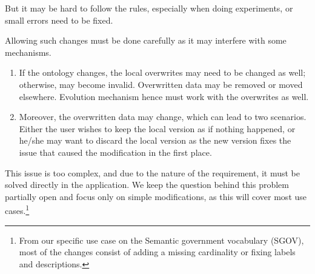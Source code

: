 But it may be hard to follow the rules, especially when doing experiments, or small errors need to be fixed.

Allowing such changes must be done carefully as it may interfere with some mechanisms.
\begin{enumerate}
  \item If the ontology changes, the local overwrites may need to be changed as well; otherwise, may become invalid. Overwritten data may be removed or moved elsewhere. Evolution mechanism hence must work with the overwrites as well.
  \item Moreover, the overwritten data may change, which can lead to two scenarios. Either the user wishes to keep the local version as if nothing happened, or he/she may want to discard the local version as the new version fixes the issue that caused the modification in the first place.
\end{enumerate}

This issue is too complex, and due to the nature of the requirement, it must be solved directly in the application. We keep the question behind this problem partially open and focus only on simple modifications, as this will cover most use cases.\footnote{From our specific use case on the Semantic government vocabulary (SGOV), most of the changes consist of adding a missing cardinality or fixing labels and descriptions.}